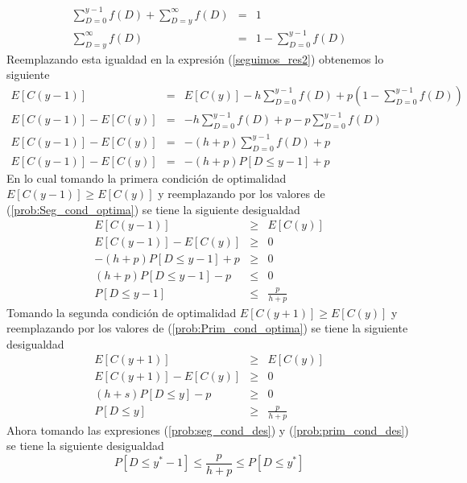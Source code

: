 \begin{eqnarray}
	\sum\limits_{D = 0}^{y-1}f(D) + \sum\limits_{D = y}^{\infty} f(D) &=& 1 \nonumber \\
	\sum\limits_{D = y}^{\infty} f(D) &=& 1 - \sum\limits_{D = 0}^{y-1}f(D) \nonumber
\end{eqnarray}
Reemplazando esta igualdad en la expresión (\ref{seguimos_res2}) obtenemos lo siguiente
\begin{eqnarray}
	\label{prob:Seg_cond_optima}
	E[C(y-1)] &=& E[C(y)] - h \sum\limits_{D = 0}^{y-1}f(D) + p \left( 1 - \sum\limits_{D = 0}^{y-1}f(D) \right) \nonumber \\
	E[C(y-1)] - E[C(y)] &=& - h \sum\limits_{D = 0}^{y-1}f(D) + p - p \sum\limits_{D = 0}^{y-1} f(D) \nonumber \\
	E[C(y-1)] - E[C(y)] &=& - (h+p) \sum\limits_{D = 0}^{y-1}f(D) + p \nonumber \\
	E[C(y-1)] - E[C(y)] &=& - (h+p) P[D \leq y-1] + p
\end{eqnarray}
En lo cual tomando la primera condición de optimalidad $E[C(y-1)] \geq E[C(y)]$ y reemplazando por los valores de (\ref{prob:Seg_cond_optima}) se tiene la siguiente desigualdad
\begin{eqnarray}
	\label{prob:seg_cond_des}
	E[C(y-1)] & \geq & E[C(y)] \nonumber \\
	E[C(y-1)] - E[C(y)] & \geq & 0 \nonumber \\
	- (h+p) P[D \leq y-1] + p & \geq & 0 \nonumber \\
	(h+p) P[D \leq y-1] - p & \leq & 0 \nonumber \\
	P[D \leq y-1] & \leq & \frac{p}{h+p}
\end{eqnarray}
Tomando la segunda condición de optimalidad $E[C(y+1)] \geq E[C(y)]$ y reemplazando por los valores de (\ref{prob:Prim_cond_optima}) se tiene la siguiente desigualdad
\begin{eqnarray}
	\label{prob:prim_cond_des}
	E[C(y+1)] & \geq & E[C(y)] \nonumber \\
	E[C(y+1)] - E[C(y)] & \geq & 0 \nonumber \\
	(h+s) P[D \leq y] - p & \geq & 0 \nonumber \\
	P[D \leq y] & \geq & \frac{p}{h+p}
\end{eqnarray}
Ahora tomando las expresiones (\ref{prob:seg_cond_des}) y (\ref{prob:prim_cond_des}) se tiene la siguiente desigualdad
\begin{equation}
	P[D \leq y^* - 1] \leq \frac{p}{h+p} \leq P[D \leq y^*]
\end{equation}

